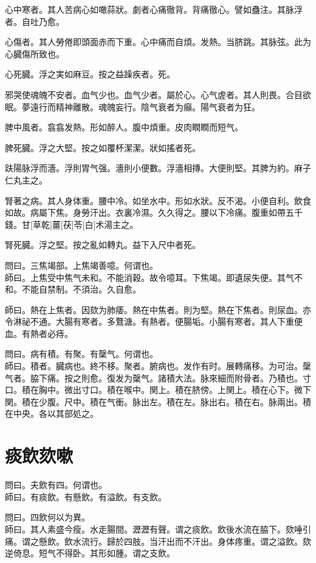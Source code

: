 \documentclass[12pt,twoside,UTF8,b5paper]{ctexbook}
\begin{document}
心中寒者。其人苦病心如噉蒜狀。劇者心痛徹背。背痛徹心。譬如蠱注。其脉浮者。自吐乃愈。

心傷者。其人勞倦即頭面赤而下重。心中痛而自煩。发熱。当脐跳。其脉弦。此为心臓傷所致也。

心死臓。浮之実如麻豆。按之益躁疾者。死。

邪哭使魂魄不安者。血气少也。血气少者。屬於心。心气虗者。其人則畏。合目欲眠。夢遠行而精神離散。魂魄妄行。陰气衰者为癲。陽气衰者为狂。

脾中風者。翕翕发熱。形如醉人。腹中煩重。皮肉瞤瞤而短气。

脾死臓。浮之大堅。按之如覆杯潔潔。狀如搖者死。

趺陽脉浮而濇。浮則胃气强。濇則小便數。浮濇相摶。大便則堅。其脾为約。麻子仁丸主之。

腎著之病。其人身体重。腰中冷。如坐水中。形如水狀。反不渴。小便自利。飲食如故。病屬下焦。身勞汗出。衣裏冷濕。久久得之。腰以下冷痛。腹重如帶五千錢。甘[草乾]薑[茯]苓[白]术湯主之。

腎死臓。浮之堅。按之亂如轉丸。益下入尺中者死。

問曰。三焦竭部。上焦竭善噫。何谓也。\\
師曰。上焦受中焦气未和。不能消穀。故令噫耳。下焦竭。即遺尿失便。其气不和。不能自禁制。不須治。久自愈。

師曰。熱在上焦者。因欬为肺痿。熱在中焦者。則为堅。熱在下焦者。則尿血。亦令淋祕不通。大腸有寒者。多鶩溏。有熱者。便腸垢。小腸有寒者。其人下重便血。有熱者必痔。

問曰。病有積。有聚。有䅽气。何谓也。\\
師曰。積者。臓病也。終不移。聚者。腑病也。发作有时。展轉痛移。为可治。䅽气者。脇下痛。按之則愈。復发为䅽气。諸積大法。脉來細而附骨者。乃積也。寸口。積在胸中。微出寸口。積在喉中。関上。積在脐傍。上関上。積在心下。微下関。積在少腹。尺中。積在气衝。脉出左。積在左。脉出右。積在右。脉兩出。積在中央。各以其部処之。

\chapter{痰飲欬嗽}

問曰。夫飲有四。何谓也。\\
師曰。有痰飲。有懸飲。有溢飲。有支飲。

問曰。四飲何以为異。\\
師曰。其人素盛今瘦。水走腸間。瀝瀝有聲。谓之痰飲。飲後水流在脇下。欬唾引痛。谓之懸飲。飲水流行。歸於四肢。当汗出而不汗出。身体疼重。谓之溢飲。欬逆倚息。短气不得卧。其形如腫。谓之支飲。
\end{document}
